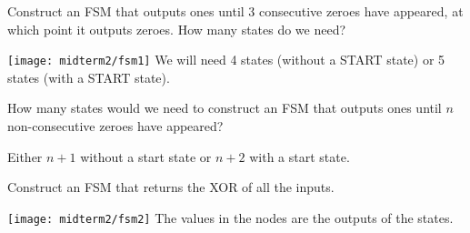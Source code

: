 \begin{blocksection}
\question
Construct an FSM that outputs ones until 3 consecutive zeroes have appeared, at which point it outputs zeroes. How many states do we need?

\begin{solution}[1.5in]
\texttt{[image: midterm2/fsm1]}
We will need 4 states (without a START state) or 5 states (with a START state).
\end{solution}

\question
How many states would we need to construct an FSM that outputs ones until $n$ non-consecutive zeroes have appeared?

\begin{solution}[0.7in]
Either $n + 1$ without a start state or $n + 2$ with a start state.
\end{solution}

\question
Construct an FSM that returns the XOR of all the inputs.

\begin{solution}[0.7in]
\texttt{[image: midterm2/fsm2]}
The values in the nodes are the outputs of the states.
\end{solution}

\end{blocksection}